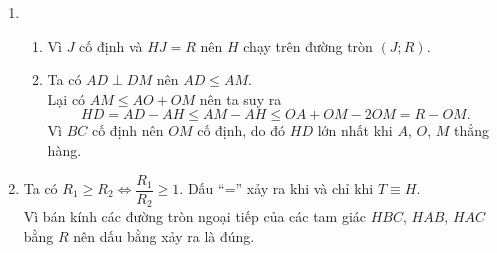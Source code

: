 \begin{bt}
{\begin{enumerate}
\begin{enumerate}[1)]
				\item Gọi $ G' $ là giao điểm của $ HO $ và $ AM $. Xét tam giác $ AFH $ có $ AM $, $ HO $ là các đường trung tuyến nên $ G' $ là trọng tâm tam giác $ AFH $. Do đó $ AG'=2G'M\Rightarrow G'\equiv G $.\\
				Vậy $ H,\ G,\ O $ thẳng hàng và $ HG=2GO $.
				\item Xét tam giác $ HAF $ ta có $ IM $ là đường trung bình nên $ IM $ cắt $ HO $ tại $ O' $ là trung điểm của $ HO $.\\
				Chứng minh tương tự ta cũng có các đường thẳng $ NL,\ PK $ đi qua $ N,\ P $ lần lượt song song với $ OC $, $ OB $ cũng đi qua $ O' $.
				\item Xét tam giác $ IDM $ vuông tại $ D $ có $ O' $ là trung điểm của $ IM $ nên
				\[
				O'D=O'I=O'M=\dfrac{1}{2}IM=\dfrac{R}{2}.\tag{1}
				\]
				Tương tự ta cũng có
				\begin{align}
				&O'K=O'E=O'P=\dfrac{R}{2}.\tag{2}\\
				&O'N=O'Q=O'L=\dfrac{R}{2}.\tag{3}
				\end{align}
				Từ $ (1) $, $ (2) $, $ (3) $ ta suy ra chín điểm $ M $, $ N $, $ P $, $ I $, $ K $, $ L $, $ D $, $ E $, $ Q $ cùng thuộc đường tròn tâm $ O' $ có bán kính là $ \dfrac{R}{2} $.
				\item Ta có $ AH=2OM\Rightarrow AH=OJ $. Vì $ AH\parallel OJ $ nên $ AHJO $ là hình bình hành, do đó $ JH=AO=R $.\\
				Vì $ BOCJ $ là hình thoi nên $ JB=JC=OB=R $, suy ra $ JB=JC=JH=R $.\\
				Tương tự ta có bán kính đường tròn ngoại tiếp các tam giác $ HAB $, $ HAC $ bằng $ R $.
			\end{enumerate}
			\item \hfill
			\begin{enumerate}[1)]
				\item Vì $ J $ cố định và $ HJ=R $ nên $ H $ chạy trên đường tròn $ (J;R) $.
				\item Ta có $ AD\perp DM $ nên $ AD\leq AM $.\\
				Lại có $ AM\leq AO+OM$ nên ta suy ra
				\[
				HD=AD-AH\leq AM-AH\leq OA+OM-2OM=R-OM.
				\]
				Vì $ BC $ cố định nên $ OM $ cố định, do đó $ HD $ lớn nhất khi $ A $, $ O $, $ M $ thẳng hàng.
			\end{enumerate}
			\item Ta có $ R_{1}\geq R_{2}\Leftrightarrow \dfrac{R_{1}}{R_{2}}\geq 1 $. Dấu ``='' xảy ra khi và chỉ khi $ T\equiv H $.\\
			Vì bán kính các đường tròn ngoại tiếp của các tam giác $ HBC $, $ HAB $, $ HAC $ bằng $ R $ nên dấu bằng xảy ra là đúng.
		\end{enumerate}
	}
\end{bt}


